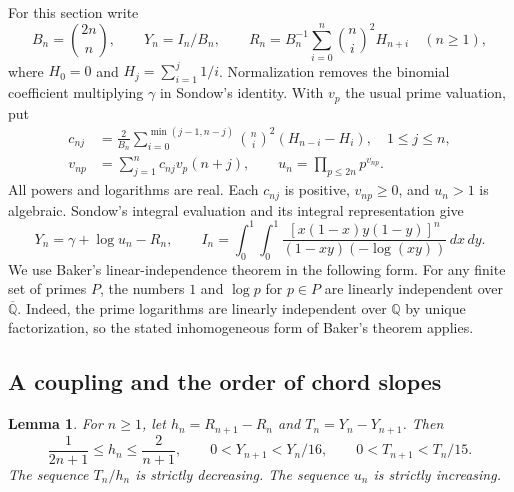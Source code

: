 \documentclass[11pt,a4paper]{article}
\newtheorem{lemma}[theorem]{Lemma}\newtheorem{proposition}[theorem]{Proposition}\newtheorem{corollary}[theorem]{Corollary}
\theoremstyle{definition}\newtheorem{definition}[theorem]{Definition}\newtheorem{example}[theorem]{Example}
\theoremstyle{remark}\newtheorem{remark}[theorem]{Remark}
\newcommand{\Q}{\mathbb Q}\newcommand{\Z}{\mathbb Z}\newcommand{\R}{\mathbb R}\newcommand{\N}{\mathbb N}
\begin{document}
For this section write
\[
 B_n=\binom{2n}{n},\qquad Y_n=I_n/B_n,\qquad
 R_n=B_n^{-1}\sum_{i=0}^{n}\binom ni^2H_{n+i}
 \quad(n\ge1),
\]
where $H_0=0$ and $H_j=\sum_{i=1}^j1/i$. Normalization removes the binomial coefficient multiplying $\gamma$ in Sondow's identity. With $v_p$ the usual prime valuation, put
\begin{align}
 c_{nj}&=\frac2{B_n}\sum_{i=0}^{\min(j-1,n-j)}
            \binom ni^2(H_{n-i}-H_i),\quad 1\le j\le n,
 \label{eq:ub-c}\\
 v_{np}&=\sum_{j=1}^n c_{nj}v_p(n+j),\qquad
 u_n=\prod_{p\le 2n}p^{v_{np}}. \label{eq:ub-v}
\end{align}
All powers and logarithms are real. Each $c_{nj}$ is positive,
$v_{np}\ge0$, and $u_n>1$ is algebraic. Sondow's integral evaluation
\cite{Sondow} and its integral representation give
\begin{equation}
 Y_n=\gamma+\log u_n-R_n,\qquad
 I_n=\int_0^1\!\int_0^1
 \frac{[x(1-x)y(1-y)]^n}{(1-xy)(-\log(xy))}\,dx\,dy .
 \label{eq:ub-decomp}
\end{equation}
We use Baker's linear-independence theorem \cite{Baker} in the
following form. For any finite set of primes $P$, the numbers $1$
and $\log p$ for $p\in P$ are linearly independent over
$\overline{\Q}$. Indeed, the prime logarithms are linearly
independent over $\Q$ by unique factorization, so the stated
inhomogeneous form of Baker's theorem applies.

\subsection{A coupling and the order of chord slopes}

\begin{lemma}
\label{lem:ub-coupling}
For $n\ge1$, let $h_n=R_{n+1}-R_n$ and $T_n=Y_n-Y_{n+1}$. Then
\[
 \frac1{2n+1}\le h_n\le\frac2{n+1},\qquad
 0<Y_{n+1}<Y_n/16,\qquad 0<T_{n+1}<T_n/15 .
\]
The sequence $T_n/h_n$ is strictly decreasing. The sequence $u_n$
is strictly increasing.
\end{lemma}
\end{document}
